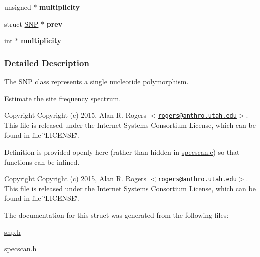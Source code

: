 \begin{DoxyCompactItemize}
\item 
\hypertarget{struct_s_n_p_a9e848e44d0dd7e060f530c468802c776}{unsigned $\ast$ {\bfseries multiplicity}}\label{struct_s_n_p_a9e848e44d0dd7e060f530c468802c776}

\item 
\hypertarget{struct_s_n_p_a2da17d57816ad32f5882bf1a75824b5b}{struct \hyperlink{struct_s_n_p}{\-S\-N\-P} $\ast$ {\bfseries prev}}\label{struct_s_n_p_a2da17d57816ad32f5882bf1a75824b5b}

\item 
\hypertarget{struct_s_n_p_a291d4e2023b34d056c0ba24e54cb8c63}{int $\ast$ {\bfseries multiplicity}}\label{struct_s_n_p_a291d4e2023b34d056c0ba24e54cb8c63}

\end{DoxyCompactItemize}


\subsubsection{\-Detailed \-Description}
\-The \hyperlink{struct_s_n_p}{\-S\-N\-P} class represents a single nucleotide polymorphism. 

\-Estimate the site frequency spectrum.

\begin{DoxyCopyright}{\-Copyright}
\-Copyright (c) 2015, \-Alan \-R. \-Rogers $<$\href{mailto:rogers@anthro.utah.edu}{\tt rogers@anthro.\-utah.\-edu}$>$. \-This file is released under the \-Internet \-Systems \-Consortium \-License, which can be found in file \char`\"{}\-L\-I\-C\-E\-N\-S\-E\char`\"{}.
\end{DoxyCopyright}
\-Definition is provided openly here (rather than hidden in \hyperlink{specscan_8c}{specscan.\-c}) so that functions can be inlined.

\begin{DoxyCopyright}{\-Copyright}
\-Copyright (c) 2015, \-Alan \-R. \-Rogers $<$\href{mailto:rogers@anthro.utah.edu}{\tt rogers@anthro.\-utah.\-edu}$>$. \-This file is released under the \-Internet \-Systems \-Consortium \-License, which can be found in file \char`\"{}\-L\-I\-C\-E\-N\-S\-E\char`\"{}. 
\end{DoxyCopyright}


\-The documentation for this struct was generated from the following files\-:\begin{DoxyCompactItemize}
\item 
\hyperlink{snp_8h}{snp.\-h}\item 
\hyperlink{specscan_8h}{specscan.\-h}\end{DoxyCompactItemize}
